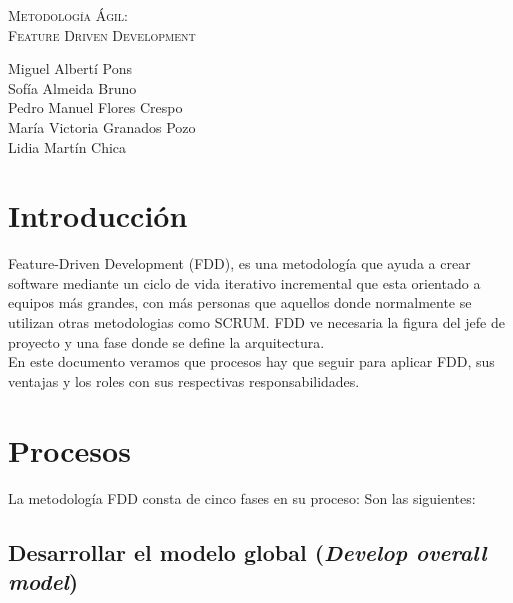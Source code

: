 \documentclass[11pt]{article}
\begin{document}
\begin{titlepage}
\centering
\vspace{4.5cm}
{\scshape\LARGE Metodología Ágil:\\ Feature Driven Development\par}
\vspace{1.5cm}


\vspace{3cm}
{\scshape\large \par}
\vspace{1cm}

{Miguel Albertí Pons\\
Sofía Almeida Bruno\\
Pedro Manuel Flores Crespo\\
María Victoria Granados Pozo\\
Lidia Martín Chica
\par}

\end{titlepage}

\thispagestyle{empty}
\tableofcontents

\newpage

\section{Introducción}

Feature-Driven Development (FDD), es una metodología que ayuda a crear software mediante un ciclo de vida iterativo incremental que esta orientado a equipos más grandes, con más personas que aquellos donde normalmente se utilizan otras metodologias como SCRUM. FDD ve necesaria la figura del jefe de proyecto y una fase donde se define la arquitectura. \\
En este documento veramos que procesos hay que seguir para aplicar FDD, sus ventajas y los roles con sus respectivas responsabilidades.




\section{Procesos}

La metodología FDD consta de cinco fases en su proceso: Son las siguientes:
\subsection{Desarrollar el modelo global (\textit{Develop overall model})}
\end{document}
